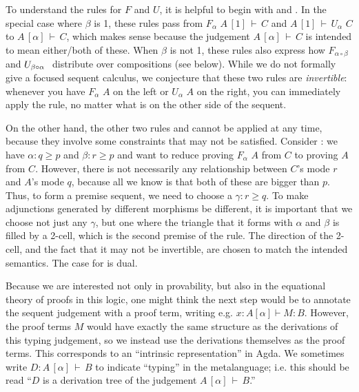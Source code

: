 \documentclass{drl-common/llncs}
\newcommand\compo[2]{\ensuremath{#1 \circ #2}}
\newcommand\F[2]{\ensuremath{F_{#1} \,\, #2}}
\newcommand\U[2]{\ensuremath{U_{#1} \,\, #2}}
\newcommand\seq[3]{\ensuremath{#1 \, [ #2 ] \, \vdash \, #3}}
\renewcommand\irl[1]{\dsd{#1}}
\begin{document}
To understand the rules for $F$ and $U$, it is helpful to begin with
\irl{FL} and \irl{UR}.  In the special case where $\beta$ is 1, these
rules pass from \seq{\F {\alpha}{A}}{1}{C} and \seq{A}{1}{\U{\alpha}{C}}
to \seq{A}{\alpha}{C}, which makes sense because the judgement
\seq{A}{\alpha}{C} is intended to mean either/both of these.  When
$\beta$ is not 1, these rules also express how
$\F{\compo{\alpha}{\beta}}{}$ and $\U{\compo{\beta}{\alpha}}$ distribute
over compositions (see below).  While we do not formally give a focused
sequent calculus, we conjecture that these two rules are
\emph{invertible}: whenever you have \F{\alpha}{A} on the left or
\U{\alpha}{A} on the right, you can immediately apply the rule, no
matter what is on the other side of the sequent.

On the other hand, the other two rules \irl{UL} and \irl{FR} cannot be
applied at any time, because they involve some constraints that may not
be satisfied.  Consider \irl{FR}: we have $\alpha : q \ge p$ and $\beta
: r \ge p$ and want to reduce proving \F{\alpha}{A} from $C$ to proving
$A$ from $C$.  However, there is not necessarily any relationship
between $C$'s mode $r$ and $A$'s mode $q$, because all we know is that
both of these are bigger than $p$.  Thus, to form a premise sequent, we
need to choose a $\gamma : r \ge q$.  To make adjunctions generated by
different morphisms be different, it is important that we choose not
just any $\gamma$, but one where the triangle that it forms with
$\alpha$ and $\beta$ is filled by a 2-cell, which is the second premise
of the rule.  The direction of the 2-cell, and the fact that it may not
be invertible, are chosen to match the intended semantics.  The case for
\irl{UL} is dual.

Because we are interested not only in provability, but also in the
equational theory of proofs in this logic, one might think the next step
would be to annotate the sequent judgement with a proof term, writing
e.g. $x : A [ \alpha ] \vdash M : B$.  However, the proof terms $M$
would have exactly the same structure as the derivations of this typing
judgement, so we instead use the derivations themselves as the proof
terms.  This corresponds to an ``intrinsic representation'' in Agda.  We
sometimes write $D : \seq{A}{\alpha}{B}$ to indicate ``typing'' in the
metalanguage; i.e. this should be read ``$D$ is a derivation tree of the
judgement \seq{A}{\alpha}{B}.''
\end{document}
